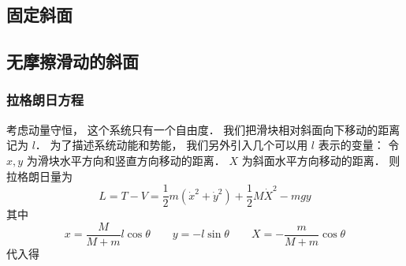 
\subsection{固定斜面}

\subsection{无摩擦滑动的斜面}

\subsubsection{拉格朗日方程}
考虑动量守恒， 这个系统只有一个自由度． 我们把滑块相对斜面向下移动的距离记为 $l$． 为了描述系统动能和势能， 我们另外引入几个可以用 $l$ 表示的变量： 令 $x, y$ 为滑块水平方向和竖直方向移动的距离． $X$ 为斜面水平方向移动的距离． 则拉格朗日量为
\begin{equation}
L = T - V = \frac12 m(\dot x^2 + \dot y^2) + \frac12 M \dot X^2 - mgy
\end{equation}
其中
\begin{equation}
x = \frac{M}{M + m}l\cos\theta
\qquad
y = -l\sin\theta
\qquad
X = -\frac{m}{M + m}\cos\theta
\end{equation}
代入得
\begin{equation}

\end{equation}
